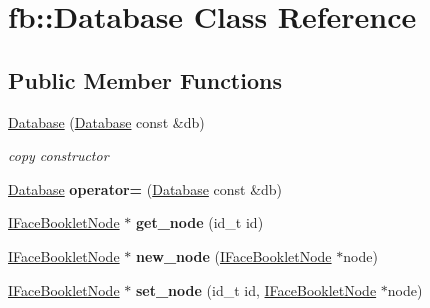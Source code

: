 \hypertarget{classfb_1_1_database}{\section{fb\+:\+:Database Class Reference}
\label{classfb_1_1_database}
}
\subsection*{Public Member Functions}
\begin{DoxyCompactItemize}
\item 
\hypertarget{classfb_1_1_database_a6ea6c4bc9187969306785b351891a876}{\hyperlink{classfb_1_1_database_a6ea6c4bc9187969306785b351891a876}{Database} (\hyperlink{classfb_1_1_database}{Database} const \&db)}\label{classfb_1_1_database_a6ea6c4bc9187969306785b351891a876}

\begin{DoxyCompactList}\small\item\em copy constructor \end{DoxyCompactList}\item 
\hypertarget{classfb_1_1_database_a08fa4cc0b0746a3af74bc8b475c816fa}{\hyperlink{classfb_1_1_database}{Database} {\bfseries operator=} (\hyperlink{classfb_1_1_database}{Database} const \&db)}\label{classfb_1_1_database_a08fa4cc0b0746a3af74bc8b475c816fa}

\item 
\hypertarget{classfb_1_1_database_a37037408e2ece4145b6d5487b3fff140}{\hyperlink{structfb_1_1_i_face_booklet_node}{I\+Face\+Booklet\+Node} $\ast$ {\bfseries get\+\_\+node} (id\+\_\+t id)}\label{classfb_1_1_database_a37037408e2ece4145b6d5487b3fff140}

\item 
\hypertarget{classfb_1_1_database_a6c7d28b50a83abc53dea5957231cba36}{\hyperlink{structfb_1_1_i_face_booklet_node}{I\+Face\+Booklet\+Node} $\ast$ {\bfseries new\+\_\+node} (\hyperlink{structfb_1_1_i_face_booklet_node}{I\+Face\+Booklet\+Node} $\ast$node)}\label{classfb_1_1_database_a6c7d28b50a83abc53dea5957231cba36}

\item 
\hypertarget{classfb_1_1_database_a33759a955ab671e0fe014d478250cdc2}{\hyperlink{structfb_1_1_i_face_booklet_node}{I\+Face\+Booklet\+Node} $\ast$ {\bfseries set\+\_\+node} (id\+\_\+t id, \hyperlink{structfb_1_1_i_face_booklet_node}{I\+Face\+Booklet\+Node} $\ast$node)}\label{classfb_1_1_database_a33759a955ab671e0fe014d478250cdc2}


\end{DoxyCompactItemize}
